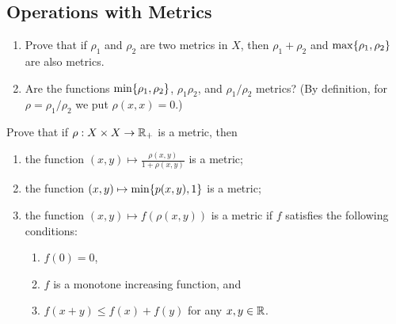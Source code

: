 \subsection{Operations with Metrics}
\begin{minorEx}
    \begin{enumerate}
        \item Prove that if $\rho_1$ and $\rho_2$ are two metrics in $X$, then
            $\rho_1 + \rho_2$ and $\max \{\rho_1, \rho_2\}$ are also metrics.
        \item Are the functions $\min\{\rho_1, \rho_2\}$, $\rho_1 \rho_2$, and
            $\rho_1 / \rho_2$ metrics? (By definition, for $\rho = \rho_1 /
            \rho_2$ we put $\rho(x, x) = 0$.)
    \end{enumerate}
\end{minorEx}

\begin{minorEx}
    Prove that if $\rho : X \times X \to \mathbb{R}_+$ is a metric, then
    \begin{enumerate}
        \item the function $(x, y) \mapsto \frac{\rho(x,y)}{1 + \rho(x,y)}$ is a
            metric;
        \item the function $(x, y) \mapsto \min\{p(x,y), 1\}$ is a metric;
        \item the function $(x, y) \mapsto f(\rho(x,y))$ is a metric if $f$
            satisfies the following conditions:
            \begin{enumerate}
                \item $f(0) = 0$,
                \item $f$ is a monotone increasing function, and
                \item $f(x + y) \leq f(x) + f(y)$ for any $x, y \in \mathbb{R}$.
            \end{enumerate}
    \end{enumerate}
\end{minorEx}

